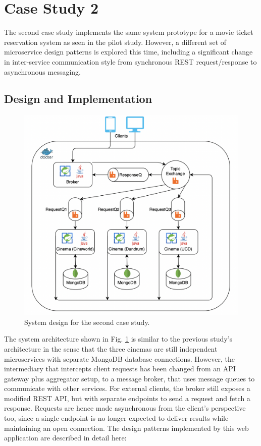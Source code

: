 \section{Case Study 2}

The second case study implements the same system prototype for a movie ticket reservation system as seen in the pilot study. However, a different set of microservice design patterns is explored this time, including a significant change in inter-service communication style from synchronous REST request/response to asynchronous messaging.

\subsection{Design and Implementation}

\begin{figure}[H]
  \centering
  \includegraphics[width=0.6\linewidth]{./assets/diagrams/cs02-arch.png}
  \caption{System design for the second case study.}
  \label{fig:cs02-arch}
\end{figure}

The system architecture shown in Fig. \ref{fig:cs02-arch} is similar to the previous study's architecture in the sense that the three cinemas are still independent microservices with separate MongoDB database connections. However, the intermediary that intercepts client requests has been changed from an API gateway plus aggregator setup, to a message broker, that uses message queues to communicate with other services. For external clients, the broker still exposes a modified REST API, but with separate endpoints to send a request and fetch a response. Requests are hence made asynchronous from the client's perspective too, since a single endpoint is no longer expected to deliver results while maintaining an open connection. The design patterns implemented by this web application are described in detail here:


